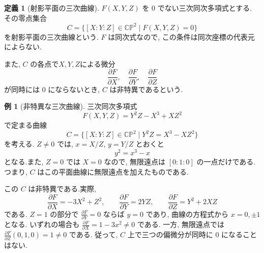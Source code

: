 \documentclass[dvipdfmx,a4paper,11pt]{article} %
\newcommand{\C}{\mathbb{C}}
\theoremstyle{definition}
\numberwithin{equation}{section}
\newtheorem{dfn}[thm]{定義}
\newtheorem{exa}[thm]{例}
\begin{document}
\begin{dfn}[射影平面の三次曲線]
$F(X,Y,Z)$ を $0$ でない三次同次多項式とする.
その零点集合
\[
C=\{[X:Y:Z]\in\C\mathbb P^2\mid F(X,Y,Z)=0\}
\]
を射影平面の三次曲線という.
$F$ は同次式なので, この条件は同次座標の代表元によらない.

また, $C$ の各点で$X, Y, Z$による微分
\[
\frac{\partial F}{\partial X},\quad \frac{\partial F}{\partial Y},\quad \frac{\partial F}{\partial Z}
\]
が同時には $0$ にならないとき, $C$ は非特異であるという.
\end{dfn}

\begin{exa}[非特異な三次曲線]
三次同次多項式
\[
F(X,Y,Z)=Y^2Z-X^3+XZ^2
\]
で定まる曲線
\[
C=\{[X:Y:Z]\in\C\mathbb P^2\mid Y^2Z=X^3-XZ^2\}
\]
を考える.
$Z\neq0$ では, $x=X/Z$, $y=Y/Z$ とおくと
\[
y^2=x^3-x
\]
となる.また, $Z=0$ では $X=0$ なので, 
無限遠点は $[0:1:0]$ の一点だけである.
つまり, $C$ はこの平面曲線に無限遠点を加えたものである.

この $C$ は非特異である.実際, 
\[
\frac{\partial F}{\partial X}=-3X^2+Z^2,\qquad
\frac{\partial F}{\partial Y}=2YZ,\qquad
\frac{\partial F}{\partial Z}=Y^2+2XZ
\]
である.
$Z=1$ の部分で $\frac{\partial F}{\partial Y}=0$ ならば $y=0$ であり, 
曲線の方程式から $x=0,\pm1$ となる.
いずれの場合も $\frac{\partial F}{\partial X}=1-3x^2\neq0$ である.
一方, 無限遠点では $\frac{\partial F}{\partial Z}(0,1,0)=1\neq0$ である.
従って, $C$ 上で三つの偏微分が同時に $0$ になることはない.
\end{exa}
\end{document}
